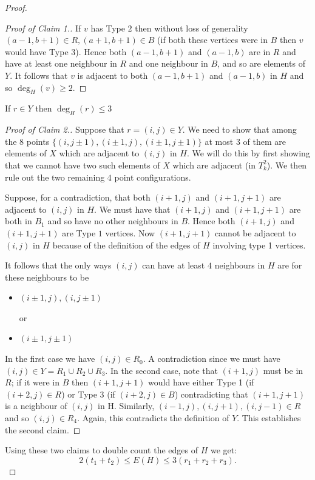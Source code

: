 \documentclass[10pt,a4paper]{amsart}
\begin{document}
\begin{proof}
\begin{proof}[Proof of Claim 1.]
If $v$ has Type $2$ then without loss of generality $(a-1,b+1)\in R, (a+1,b+1)\in B$ (if both these vertices were in $B$ then $v$ would have Type $3$). Hence both $(a-1,b+1)$ and $(a-1,b)$ are in $R$ and have at least one neighbour in $R$ and one neighbour in $B$, and so are elements of $Y$. It follows that $v$ is adjacent to both $(a-1,b+1)$ and $(a-1,b)$ in $H$ and so $\deg_H(v)\geq 2$.
\end{proof}

\begin{claim}
If $r\in Y$ then $\deg_H(r)\leq 3$
\end{claim}

\begin{proof}[Proof of Claim 2.]
Suppose that $r=(i,j)\in Y$. We need to show that among the $8$ points $\{(i,j\pm1), (i\pm1,j),(i\pm1,j\pm1)\}$ at most $3$ of them are elements of $X$ which are adjacent to $(i,j)$ in $H$. We will do this by first showing that we cannot have two such elements of $X$ which are adjacent (in $T_k^2$). We then rule out the two remaining $4$ point configurations.  

Suppose, for a contradiction, that both $(i+1,j)$ and $(i+1,j+1)$ are adjacent to $(i,j)$ in $H$. We must have that $(i+1,j)$ and $(i+1,j+1)$ are both in $B_1$ and so have no other neighbours in $B$. Hence both $(i+1,j)$ and $(i+1,j+1)$ are Type $1$ vertices. Now $(i+1,j+1)$ cannot be adjacent to $(i,j)$ in $H$ because of the definition of the edges of $H$ involving type 1 vertices. 

It follows that the only ways $(i,j)$ can have at least $4$ neighbours in $H$ are for these neighbours to be
\begin{itemize}
\item $(i\pm 1,j), (i,j\pm 1)$

or

\item $(i\pm 1,j\pm 1)$
\end{itemize}
In the first case we have $(i,j)\in R_0$. A contradiction since we must have $(i,j)\in Y=R_1\cup R_2\cup R_3$. In the second case, note that $(i+1,j)$ must be in $R$; if it were in $B$ then $(i+1,j+1)$ would have either Type 1 (if $(i+2,j)\in R$) or Type 3 (if $(i+2,j)\in B$) contradicting that $(i+1,j+1)$ is a neighbour of $(i,j)$ in H. Similarly, $(i-1,j),(i,j+1),(i,j-1)\in R$ and so $(i,j)\in R_4$. Again, this contradicts the definition of $Y$. This establishes the second claim.
\end{proof}

Using these two claims to double count the edges of $H$ we get:
\[
2(t_1+t_2)\leq E(H)\leq 3(r_1+r_2+r_3).
\]


\end{proof}
\end{document}
